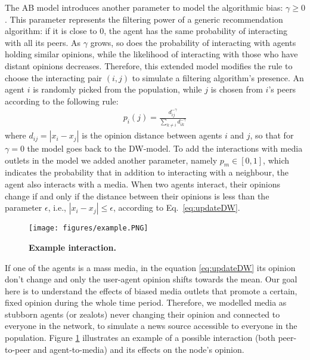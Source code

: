 \documentclass[10pt,letterpaper]{article}
\begin{document}
The AB model introduces another parameter to model the algorithmic bias: $\gamma \geq 0$. This parameter represents the filtering power of a generic recommendation algorithm: if it is close to $0$, the agent has the same probability of interacting with all its peers. As $\gamma$ grows, so does the probability of interacting with agents holding similar opinions, while the likelihood of interacting with those who have distant opinions decreases.
Therefore, this extended model modifies the rule to choose the interacting pair $(i, j)$ to simulate a filtering algorithm's presence. An agent $i$ is randomly picked from the population, while $j$ is chosen from $i$'s peers according to the following rule:
\begin{eqnarray}             
    \label{eq:algbias}
    p_{i}(j)=\frac{d_{ij}^{-\gamma}}{\sum_{k \ne i}d_{ik}^{-\gamma}}
\end{eqnarray}
where $d_{ij} = |x_{i}-x_{j}|$ is the opinion distance between agents $i$ and $j$, so that for $\gamma = 0$ the model goes back to the DW-model.
To add the interactions with media outlets in the model we added another parameter, namely $p_m \in [0, 1]$, which indicates the probability that in addition to interacting with a neighbour, the agent also interacts with a media.  
When two agents interact, their opinions change if and only if the distance between their opinions is less than the parameter $\epsilon$, i.e., \(|x_{i}-x_{j}| \leq \epsilon \), according to Eq.~\ref{eq:updateDW}.

\begin{figure}
    \centering
    \texttt{[image: figures/example.PNG]}
    \caption{\textbf{Example interaction.}}
    \label{fig:example}
\end{figure}
If one of the agents is a mass media, in the equation \ref{eq:updateDW} its opinion don't change and only the user-agent opinion shifts towards the mean. 
Our goal here is to understand the effects of biased media outlets that promote a certain, fixed opinion during the whole time period. Therefore, we modelled media as stubborn agents (or zealots) never changing their opinion and connected to everyone in the network, to simulate a news source accessible to everyone in the population. Figure \ref{fig:example} illustrates an example of a possible interaction (both peer-to-peer and agent-to-media) and its effects on the node’s opinion. 
\end{document}
